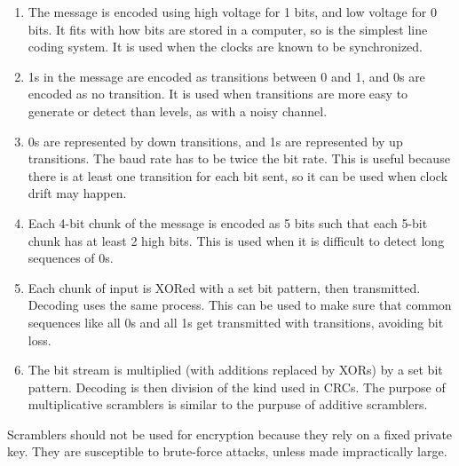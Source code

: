 \documentclass{article}
\begin{document}
\begin{enumerate}
  \item The message is encoded using high voltage for 1 bits, and low voltage for 0 bits. It fits with how bits are stored in a computer, so is the simplest line coding system. It is used when the clocks are known to be synchronized.
  \item 1s in the message are encoded as transitions between 0 and 1, and 0s are encoded as no transition. It is used when transitions are more easy to generate or detect than levels, as with a noisy channel.
  \item 0s are represented by down transitions, and 1s are represented by up transitions. The baud rate has to be twice the bit rate. This is useful because there is at least one transition for each bit sent, so it can be used when clock drift may happen.
  \item Each 4-bit chunk of the message is encoded as 5 bits such that each 5-bit chunk has at least 2 high bits. This is used when it is difficult to detect long sequences of 0s.
  \item Each chunk of input is XORed with a set bit pattern, then transmitted. Decoding uses the same process. This can be used to make sure that common sequences like all 0s and all 1s get transmitted with transitions, avoiding bit loss.
  \item The bit stream is multiplied (with additions replaced by XORs) by a set bit pattern. Decoding is then division of the kind used in CRCs. The purpose of multiplicative scramblers is similar to the purpuse of additive scramblers.
\end{enumerate}

Scramblers should not be used for encryption because they rely on a fixed private key. They are susceptible to brute-force attacks, unless made impractically large.
\end{document}
